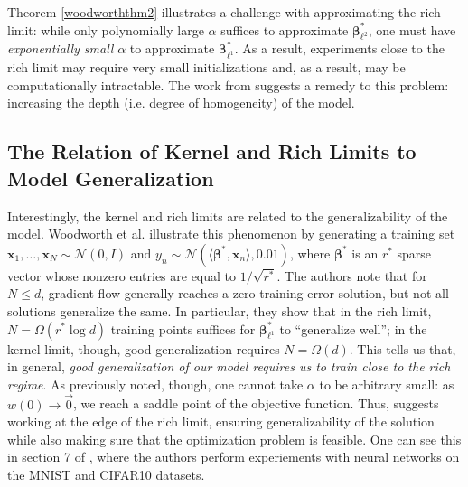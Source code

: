 \documentclass{article}
\begin{document}
Theorem \ref{woodworththm2} illustrates a challenge with approximating the rich limit: while only polynomially large $\alpha$ suffices to approximate $\boldsymbol{\beta}_{\ell^2}^*$, one must have \textit{exponentially small} $\alpha$ to approximate $\boldsymbol{\beta}_{\ell^1}^*$. As a result, experiments close to the rich limit may require very small initializations and, as a result, may be computationally intractable. The work from \cite{arora2019implicit} suggests a remedy to this problem: increasing the depth (i.e. degree of homogeneity) of the model. 

\subsection{The Relation of Kernel and Rich Limits to Model Generalization}
Interestingly, the kernel and rich limits are related to the generalizability of the model. Woodworth et al. illustrate this phenomenon by generating a training set $\boldsymbol{x}_1, \ldots, \boldsymbol{x}_N \sim \mathcal{N}(0, I)$ and $y_n \sim \mathcal{N}(\langle \boldsymbol{\beta}^*, \boldsymbol{x}_n \rangle, 0.01)$, where $\boldsymbol{\beta}^*$ is an $r^*$ sparse vector whose nonzero entries are equal to $1/\sqrt{r^*}$. The authors note that for $N \leq d$, gradient flow generally reaches a zero training error solution, but not all solutions generalize the same. In particular, they show that in the rich limit, $N = \Omega(r^*\log d)$ training points suffices for $\boldsymbol{\beta}_{\ell^1}^*$ to \enquote{generalize well}; in the kernel limit, though, good generalization requires $N = \Omega(d)$. This tells us that, in general, \textit{good generalization of our model requires us to train close to the rich regime}. As previously noted, though, one cannot take $\alpha$ to be arbitrary small: as $w(0) \rightarrow \vec{0}$, we reach a saddle point of the objective function. Thus, \cite{woodworth2020kernel} suggests working at the edge of the rich limit, ensuring generalizability of the solution while also making sure that the optimization problem is feasible. One can see this in section 7 of \cite{woodworth2020kernel}, where the authors perform experiements with neural networks on the MNIST and CIFAR10 datasets.
\end{document}
